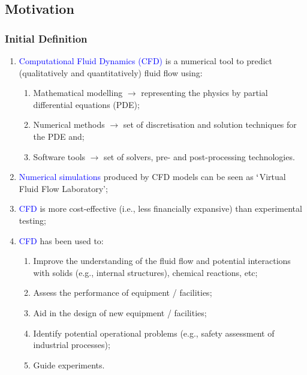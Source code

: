 \documentclass[10pt,compress,handout,ignorenonframetext]{beamer}
\begin{document}
\subsection{Motivation}
\begin{frame}
 \frametitle{Initial Definition}

\begin{enumerate}
\item <1->\textcolor{blue}{Computational Fluid Dynamics (CFD)} is a numerical tool to predict (qualitatively and quantitatively) fluid flow using:
\begin{enumerate}
\item <2-> Mathematical modelling $\rightarrow$ representing the physics by partial differential equations (PDE);
\item <3-> Numerical methods $\rightarrow$ set of discretisation and solution techniques for the PDE and;
\item <4-> Software tools $\rightarrow$ set of solvers, pre- and post-processing technologies.
\end{enumerate}
\item <5-> \textcolor{blue}{Numerical simulations} produced by CFD models can be seen as $\lq$Virtual Fluid Flow Laboratory';
\item <6-> \textcolor{blue}{CFD} is more cost-effective (i.e., less financially expansive) than experimental testing;
\item <7-> \textcolor{blue}{CFD} has been used to:
\begin{enumerate}
\item <8-> Improve the understanding of the fluid flow and potential interactions with solids (e.g., internal structures), chemical reactions, etc;
\item <9-> Assess the performance of equipment / facilities;
\item <10-> Aid in the design of new equipment / facilities;
\item <11-> Identify potential operational problems (e.g., safety assessment of industrial processes);
\item <12-> Guide experiments.
\end{enumerate}

\end{enumerate}
 
\end{frame}
\end{document}
